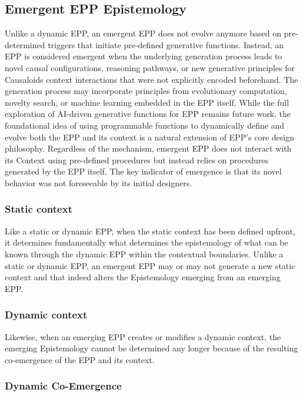 \documentclass{article}
\begin{document}
\subsection{Emergent EPP Epistemology}
\label{subsec:Emergent_EPP}

Unlike a dynamic EPP, an emergent EPP does not evolve anymore based on pre-determined triggers that initiate pre-defined generative functions. Instead, an EPP is considered emergent when the underlying generation process leads to novel causal configurations, reasoning pathways, or new generative principles for Causaloids context interactions that were not explicitly encoded beforehand.
The generation process may incorporate principles from evolutionary computation, novelty search, or machine learning embedded in the EPP itself. While the full exploration of AI-driven generative functions for EPP remains future work, the foundational idea of using programmable functions to dynamically define and evolve both the EPP and its context is a natural extension of EPP's core design philosophy. Regardless of the mechanism, emergent EPP does not interact with its Context using pre-defined procedures but instead relies on procedures generated by the EPP itself. The key indicator of emergence is that its novel behavior was not foreseeable by its initial designers.

\subsubsection{Static context}

Like a static or dynamic EPP, when the static context has been defined upfront, it determines fundamentally what determines the epistemology of what can be known through the dynamic EPP within the contextual boundaries. Unlike a static or dynamic EPP, an emergent EPP may or may not generate a new static context and that indeed alters the Epistemology emerging from an emerging EPP. 

\subsubsection{Dynamic context}

Likewise, when an emerging EPP creates or modifies a dynamic context, the emerging Epistemology cannot be determined any longer because of the resulting co-emergence of the EPP and its context.

\subsubsection{Dynamic Co-Emergence}
\end{document}
